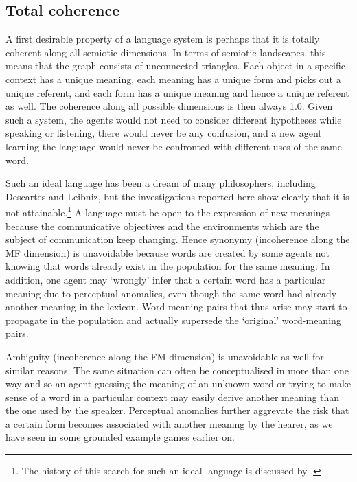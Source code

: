 \subsection{Total coherence}

A first desirable property of a language system 
is perhaps that it is totally coherent along all 
semiotic dimensions. 
In terms of semiotic landscapes, 
this means that the graph consists of unconnected triangles. 
Each object in a specific context has a unique
meaning, each meaning has a 
unique form and picks out a unique referent, and each form 
has a unique meaning and hence a unique referent as well. 
The coherence along all possible dimensions is then always
1.0. Given such a system, the agents would not need to
consider different hypotheses while speaking or listening, 
there would never be any confusion, and a new agent 
learning the language would never be confronted with 
different uses of the same word. 

Such an ideal language has been a dream of many 
philosophers, including Descartes and Leibniz, but 
the investigations reported here show clearly that 
it is not attainable.\footnote{The history of this search for such an ideal language
is discussed by \cite{Eco:1997}.}
A language must be open to the 
expression of new meanings because the communicative 
objectives and the environments which are the subject
of communication keep changing. Hence 
synonymy (incoherence along the MF dimension) is unavoidable
because words are created by some agents not knowing that 
words already exist in the population for the same meaning. 
In addition, one agent 
may `wrongly' infer that a certain word has a 
particular meaning due to perceptual anomalies, even though
the same word had already another meaning in the
lexicon. Word-meaning pairs that thus
arise may start to propagate 
in the population and actually supersede the `original' 
word-meaning pairs. 

Ambiguity (incoherence along the FM dimension) 
is unavoidable as well for similar reasons. 
The same situation can often be conceptualised in more than 
one way and so an agent guessing the meaning of an unknown 
word or trying to make sense of a word in a particular 
context may easily derive another meaning than the one 
used by the speaker. Perceptual anomalies further aggrevate
the risk that a certain form becomes associated with 
another meaning by the hearer, as we have seen in some
grounded example games earlier on. 

